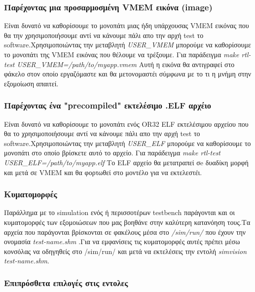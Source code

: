 \documentclass[a4paper,10pt]{article}
\numberwithin{figure}{section}
\numberwithin{table}{section}
\begin{document}
{{{\subsubsection{ Παρέχοντας μια προσαρμοσμένη VMEM εικόνα (image)}
{

Είναι δυνατό να καθορίσουμε το μονοπάτι μιας ήδη υπάρχουσας VMEM εικόνας που θα την
χρησιμοποιήσουμε αντί να κάνουμε πάλι απο την αρχή test το software.Χρησιμοποιώντας
την μεταβλητή \emph{USER\_VMEM} μπορούμε να καθορίσουμε το μονοπάτι της VMEM εικόνας
που θέλουμε να τρέξουμε. Για παράδειγμα \emph{make rtl-test USER\_VMEM=/path/to/myapp.vmem}
Αυτή η εικόνα θα αντιγραφεί στο φάκελο στον οποίο εργαζόμαστε και θα μετονομαστέι
σύμφωνα με το τι η μνήμη στην εξομοίωση απαιτεί.
}

\subsubsection{ Παρέχοντας ένα "precompiled" εκτελέσιμο .ELF αρχέιο}
{

Είναι δυνατό να καθορίσουμε το μονοπάτι ενός OR32 ELF εκτελέσιμου αρχείου που θα το
χρησιμοποιήσουμε αντί να κάνουμε πάλι απο την αρχή test το software.Χρησιμοποιώντας
την μεταβλητή \emph{USER\_ELF} μπορούμε να καθορίσουμε το μονοπάτι στο οποίο βρίσκετε
αυτό το αρχείο. Για παράδειγμα \emph{make rtl-test USER\_ELF=/path/to/myapp.elf}
Το ELF αρχείο θα μετατραπεί σe δυαδίκη μορφή και μετά σε VMEM και θα φορτωθεί στο
μοντέλο για να εκτελεστέι.
}


\subsubsection{ Κυματομορφές}
{

Παράλλημα με το simulation ενός ή περισσοτέρων testbench παράγονται και οι κυματομορφές
των εξομοιώσεων που μας βοηθάνε στην καλύτερη κατανόηση τους.Τα αρχεία που παράγονται
βρίσκονται σε φακέλους μέσα στο \emph{/sim/run/} που έχουν την ονομασία \emph{test-name.shm} .Για να
εμφανίσεις τις κυματομορφές αυτές πρέπει μέσω κονσόλας να οδηγηθείς στο /sim/run/ και
μετά να εκτελέσεις την εντολή \emph{simvision test-name.shm}.
}

\subsubsection{ Eπιπρόσθετα επιλογές στις εντολες}
{

}}}}
\end{document}
